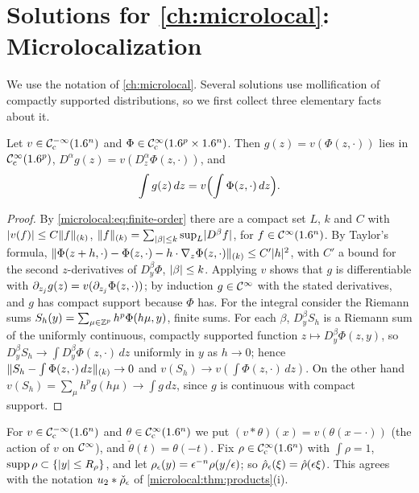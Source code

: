 \providecommand{\Tz}[1]{T^*#1\setminus0}%
\providecommand{\conesupp}{\operatorname{cone\,supp}}%
\providecommand{\Ell}{\operatorname{Ell}}%

\section{Solutions for \cref{ch:microlocal}: Microlocalization}\label{solutions:microlocal}

We use the notation of \cref{ch:microlocal}. Several solutions use
mollification of compactly supported distributions, so we first collect three
elementary facts about it.

\begin{lemma}\label{solmicrolocal:lem:fubini}
  Let $v\in\mathcal{C}^{-\infty}_{\mathrm{c}}(1.6^n)$ and $\Phi\in\mathcal{C}^\infty_{\mathrm{c}}(1.6^p\times1.6^n)$. Then
  $g(z)=v(\Phi(z,\cdot))$ lies in $\mathcal{C}^\infty_{\mathrm{c}}(1.6^p)$, $D^\alpha g(z)=v(D^\alpha_z\Phi(z,\cdot))$, and
  \begin{equation*}
    \int g(z)\,dz=v\Bigl(\int\Phi(z,\cdot)\,dz\Bigr).
  \end{equation*}
\end{lemma}
\begin{proof}
  By \eqref{microlocal:eq:finite-order} there are a compact set $L$, $k$ and $C$
  with $\lvert v(f)\rvert\le C\lVert f\rVert_{(k)}$, $\lVert f\rVert_{(k)}=\sum_{\lvert \beta\rvert\le k}\sup_L\lvert D^\beta f\rvert$,
  for $f\in\mathcal{C}^\infty(1.6^n)$. By Taylor's formula,
  $\lVert \Phi(z+h,\cdot)-\Phi(z,\cdot)-h\cdot\nabla_z\Phi(z,\cdot)\rVert_{(k)}\le C'\lvert h\rvert^2$, with
  $C'$ a bound for the second $z$-derivatives of $D^\beta_y\Phi$, $\lvert \beta\rvert\le k$. Applying $v$
  shows that $g$ is differentiable with $\partial_{z_j}g(z)=v(\partial_{z_j}\Phi(z,\cdot))$; by induction
  $g\in\mathcal{C}^\infty$ with the stated derivatives, and $g$ has compact support because $\Phi$ has.
  For the integral consider the Riemann sums $S_h(y)=\sum_{\mu\in\mathbb{Z}^p}h^p\Phi(h\mu,y)$, finite
  sums. For each $\beta$, $D^\beta_yS_h$ is a Riemann sum of the uniformly continuous, compactly
  supported function $z\mapsto D^\beta_y\Phi(z,y)$, so $D^\beta_yS_h\to\int D^\beta_y\Phi(z,\cdot)\,dz$
  uniformly in $y$ as $h\to0$; hence $\lVert S_h-\int\Phi(z,\cdot)\,dz\rVert_{(k)}\to0$ and
  $v(S_h)\to v(\int\Phi(z,\cdot)\,dz)$. On the other hand
  $v(S_h)=\sum_\mu h^pg(h\mu)\to\int g\,dz$, since $g$ is continuous with compact support.
\end{proof}

For $v\in\mathcal{C}^{-\infty}_{\mathrm{c}}(1.6^n)$ and $\theta\in\mathcal{C}^\infty_{\mathrm{c}}(1.6^n)$ we put $(v*\theta)(x)=v(\theta(x-\cdot))$ (the
action of $v$ on $\mathcal{C}^\infty$), and $\check\theta(t)=\theta(-t)$. Fix $\rho\in\mathcal{C}^\infty_{\mathrm{c}}(1.6^n)$ with
$\int\rho=1$, $\operatorname{supp}\rho\subset\{\lvert y\rvert\le R_\rho\}$, and let $\rho_\epsilon(y)=\epsilon^{-n}\rho(y/\epsilon)$; so
$\hat\rho_\epsilon(\xi)=\hat\rho(\epsilon\xi)$. This agrees with the notation $u_2*\check\rho_\epsilon$ of
\cref{microlocal:thm:products}(i).

